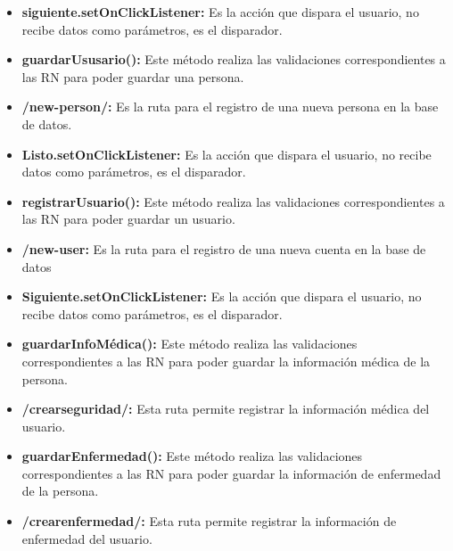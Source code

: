 \begin{itemize}
	\item \textbf{siguiente.setOnClickListener:} Es la acción que dispara el usuario, no recibe datos como parámetros, es el disparador.
	\item \textbf{guardarUsusario():} Este método realiza las validaciones correspondientes a las RN para poder guardar una persona.
	\item \textbf{/new-person/:} Es la ruta para el registro de una nueva persona en la base de datos.
	\item \textbf{Listo.setOnClickListener:}  Es la acción que dispara el usuario, no recibe datos como parámetros, es el disparador.
	\item \textbf{registrarUsuario():} Este método realiza las validaciones correspondientes a las RN para poder guardar un usuario.
	\item \textbf{/new-user:} Es la ruta para el registro de una nueva cuenta en la base de datos
	\item \textbf{Siguiente.setOnClickListener:} Es la acción que dispara el usuario, no recibe datos como parámetros, es el disparador.
	\item \textbf{guardarInfoMédica():} Este método realiza las validaciones correspondientes a las RN para poder guardar la información médica de la persona.
	\item \textbf{/crearseguridad/:} Esta ruta permite registrar la información médica del usuario.
	\item \textbf{guardarEnfermedad():} Este método realiza las validaciones correspondientes a las RN para poder guardar la información de enfermedad de la persona.
	\item \textbf{/crearenfermedad/:} Esta ruta permite registrar la información de enfermedad del usuario.
\end{itemize}


